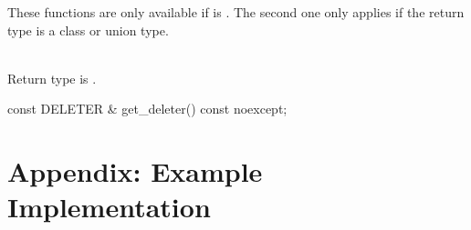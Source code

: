 \documentclass[ebook,11pt,article]{memoir}
\begin{document}
\pnum
\requires These functions are only available if  is . The second one only applies if the return type is a class or union type.

\pnum
\returns {}
\\Return type is . 

\begin{itemdecl}
	const DELETER & get_deleter() const noexcept;
\end{itemdecl}

\pnum
\returns {}



\chapter{Appendix: Example Implementation}
\end{document}
